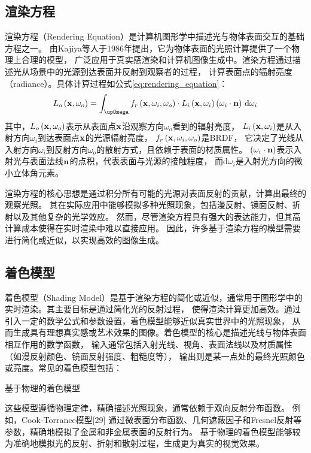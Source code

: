 \subsection{渲染方程}
渲染方程（Rendering Equation）是计算机图形学中描述光与物体表面交互的基础方程之一。
由Kajiya等人于1986年提出\cite{Kajiya_1986}，它为物体表面的光照计算提供了一个物理上合理的模型，
广泛应用于真实感渲染和计算机图像生成中。渲染方程通过描述光从场景中的光源到达表面并反射到观察者的过程，
计算表面点的辐射亮度（radiance）。具体计算过程如公式\eqref{eq:rendering_equation}：
\begin{equation}
  \label{eq:rendering_equation}
  L_o\left({\bf{x}},\omega_o\right)=\int_{\upOmega}f_r\left({\bf{x}},\omega_i,\omega_o\right)\cdot L_i\left({\bf{x}},
  \omega_i\right)\left(\omega_i\cdot\mathbf{n}\right)\,\mathrm{d}\omega_i
\end{equation}
其中，$L_o\left({\bf{x}},\omega_o\right)$表示从表面点$\bf{x}$沿观察方向$\omega_o$看到的辐射亮度，
$L_i\left({\bf{x}},\omega_i\right)$是从入射方向$\omega_i$到达表面点$\bf{x}$的光源辐射亮度，
$f_r\left({\bf{x}},\omega_i,\omega_o\right)$是BRDF，
它决定了光线从入射方向$\omega_i$到反射方向$\omega_o$的散射方式，且依赖于表面的材质属性。
$\left(\omega_i\cdot\bf{n}\right)$表示入射光与表面法线$\bf{n}$的点积，代表表面与光源的接触程度，
而$\mathrm{d}\omega_i$是入射光方向的微小立体角元素。

渲染方程的核心思想是通过积分所有可能的光源对表面反射的贡献，计算出最终的观察光照。
其在实际应用中能够模拟多种光照现象，包括漫反射、镜面反射、折射以及其他复杂的光学效应。
然而，尽管渲染方程具有强大的表达能力，但其高计算成本使得在实时渲染中难以直接应用。
因此，许多基于渲染方程的模型需要进行简化或近似，以实现高效的图像生成。

\subsection{着色模型}

着色模型（Shading Model）是基于渲染方程的简化或近似，通常用于图形学中的实时渲染。其主要目标是通过简化光的反射过程，
使得渲染计算更加高效。通过引入一定的数学公式和参数设置，着色模型能够近似真实世界中的光照现象，
从而生成具有理想真实感或艺术效果的图像。着色模型的核心是描述光线与物体表面相互作用的数学函数，
输入通常包括入射光线、视角、表面法线以及材质属性（如漫反射颜色、镜面反射强度、粗糙度等），
输出则是某一点处的最终光照颜色或亮度。常见的着色模型包括：

基于物理的着色模型

这些模型遵循物理定律，精确描述光照现象，通常依赖于双向反射分布函数。
例如，Cook-Torrance模型[29] 通过微表面分布函数、几何遮蔽因子和Fresnel反射等参数，精确地模拟了金属和非金属表面的反射行为。
基于物理的着色模型能够较为准确地模拟光的反射、折射和散射过程，生成更为真实的视觉效果。

